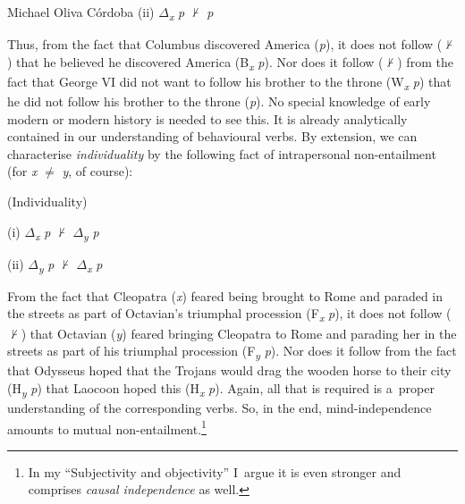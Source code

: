 \begin{artengenv}{Michael Oliva Córdoba}
(ii) $\Delta $\textit{\textsubscript{x}} \textit{p} ${\nvdash}$ \textit{p}

\medskip

Thus, from the fact that Columbus discovered America (\textit{p}), it does not follow (${\nvdash}$) that he believed he discovered America (B\textit{\textsubscript{x}} \textit{p}). Nor does it follow (${\nvdash}$) from the fact that George VI did not want to follow his brother to the throne (W\textit{\textsubscript{x}} \textit{p}) that he did not follow his brother to the throne (\textit{p}). No special knowledge of early modern or modern history is needed to see this. It is already analytically contained in our understanding of behavioural verbs. By extension, we can characterise \textit{individuality} by the following fact of intrapersonal non-entailment (for \textit{x} ${\neq}$ \textit{y}, of course):

\medskip

(Individuality)



(i) $\Delta $\textit{\textsubscript{x}} \textit{p} ${\nvdash}$ $\Delta $\textit{\textsubscript{y}} \textit{p}



(ii) $\Delta $\textit{\textsubscript{y}} \textit{p} ${\nvdash}$ $\Delta $\textit{\textsubscript{x}} \textit{p}

\medskip

From the fact that Cleopatra (\textit{x}) feared being brought to Rome and paraded in the streets as part of Octavian's triumphal procession (F\textit{\textsubscript{x}} \textit{p}), it does not follow (${\nvdash}$) that Octavian (\textit{y}) feared bringing Cleopatra to Rome and parading her in the streets as part of his triumphal procession (F\textit{\textsubscript{y}} \textit{p}). Nor does it follow from the fact that Odysseus hoped that the Trojans would drag the wooden horse to their city (H\textit{\textsubscript{y}} \textit{p}) that Laocoon hoped this (H\textit{\textsubscript{x}} \textit{p}). Again, all that is required is a~proper understanding of the corresponding verbs. So, in the end, mind-independence amounts to mutual non-entailment.\footnote{In my ``Subjectivity and objectivity'' I~argue it is even stronger and comprises \textit{causal independence} as well.}




\end{artengenv}
